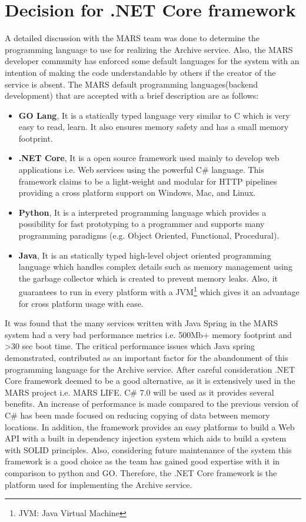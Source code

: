 \section{Decision for .NET Core framework}
\label{sec:dotnet}
A detailed discussion with the MARS team was done to determine the programming language to use for realizing the Archive service. Also, the MARS developer community 
has enforced some default languages for the system with an intention of making the code understandable by others if the creator of the service is absent.
The MARS default programming languages(backend development) that are accepted with a brief description are as follows:
\begin{itemize}
    \item \textbf{GO Lang}, It is a statically typed language very similar to C which is very easy to read, learn. It also ensures memory safety and has
    a small memory footprint.
    \item \textbf{.NET Core}, It is a open source framework used mainly to develop web applications i.e. Web services using the powerful C\# language. This framework 
    claims to be a light-weight and modular for HTTP pipelines providing a cross platform support on Windows, Mac, and Linux.
    \item \textbf{Python}, It is a interpreted programming language which provides a possibility for fast prototyping to a programmer and supports many 
    programming paradigms (e.g. Object Oriented, Functional, Procedural).
    \item \textbf{Java}, It is an statically typed high-level object oriented programming language which handles complex details such as memory management using the
    garbage collector which is created to prevent memory leaks. Also, it guarantees to run in every platform with a JVM\footnote{JVM: Java Virtual Machine} which 
    gives it an advantage for cross platform usage with ease. 
\end{itemize}
 
It was found that the many services written with Java Spring in the MARS system had a very bad performance metrics i.e. 500Mb+ memory footprint and >30 sec boot time.
The critical performance issues which Java spring demonstrated, contributed as an important factor for the abandonment of this programming language for the Archive service. After careful 
consideration .NET Core framework deemed to be a good alternative, as it is extensively used in the MARS project i.e. MARS LIFE. C\# 7.0 will be used as it provides
several benefits. An increase of performance is made compared to the previous version of C\# has been made focused on reducing copying of data between memory locations.
In addition, the framework provides an easy platforms to build a Web API with a built in dependency injection system which aids to build a system with
SOLID \cite{Hotop2015} principles. Also, considering future maintenance of the system this framework is a good choice as the team has gained good expertise with it in comparison
to python and GO. Therefore, the .NET Core framework is the platform used for implementing the Archive service.
